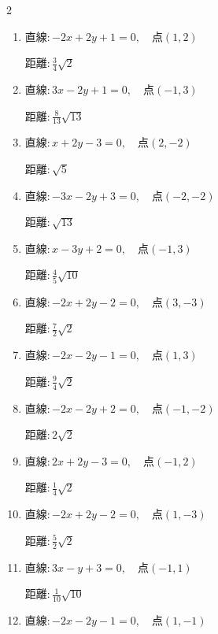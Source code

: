 \begin{multicols}{2}
\begin{enumerate}
        $\displaystyle 距離 : \frac{7}{13}\sqrt{13}$

  \item $直線:-2x+2y+1=0,\quad 点 ( 1, 2 )$

        $\displaystyle 距離 : \frac{3}{4}\sqrt{2}$

  \item $直線:3x-2y+1=0,\quad 点 ( -1, 3 )$

        $\displaystyle 距離 : \frac{8}{13}\sqrt{13}$

  \item $直線:x+2y-3=0,\quad 点 ( 2, -2 )$

        $\displaystyle 距離 : \sqrt{5}$

  \item $直線:-3x-2y+3=0,\quad 点 ( -2, -2 )$

        $\displaystyle 距離 : \sqrt{13}$

  \item $直線:x-3y+2=0,\quad 点 ( -1, 3 )$

        $\displaystyle 距離 : \frac{4}{5}\sqrt{10}$

  \item $直線:-2x+2y-2=0,\quad 点 ( 3, -3 )$

        $\displaystyle 距離 : \frac{7}{2}\sqrt{2}$

\columnbreak %

  \item $直線:-2x-2y-1=0,\quad 点 ( 1, 3 )$

        $\displaystyle 距離 : \frac{9}{4}\sqrt{2}$

  \item $直線:-2x-2y+2=0,\quad 点 ( -1, -2 )$

        $\displaystyle 距離 : 2\sqrt{2}$

  \item $直線:2x+2y-3=0,\quad 点 ( -1, 2 )$

        $\displaystyle 距離 : \frac{1}{4}\sqrt{2}$

  \item $直線:-2x+2y-2=0,\quad 点 ( 1, -3 )$

        $\displaystyle 距離 : \frac{5}{2}\sqrt{2}$

  \item $直線:3x-y+3=0,\quad 点 ( -1, 1 )$

        $\displaystyle 距離 : \frac{1}{10}\sqrt{10}$

  \item $直線:-2x-2y-1=0,\quad 点 ( 1, -1 )$


\end{enumerate}
\end{multicols}
